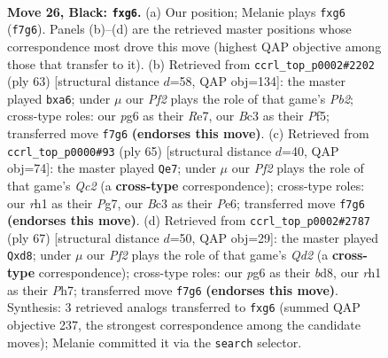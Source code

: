 \documentclass[11pt]{article}
\begin{document}
\clearpage

\begin{figure}[p]\centering
\begin{subfigure}{0.46\textwidth}\centering
\resizebox{\linewidth}{!}{%
\newchessgame
\chessboard[
  setfen={r5k1/p4p2/4p1P1/pq1p4/2rP1QP1/2b5/2P5/3K2RR b - - 0 26},
  showmover=false,
  pgfstyle=straightmove, color=movearrow, markmove={f7-g6}
]}
\caption{}
\end{subfigure}\hfill
\begin{subfigure}{0.46\textwidth}\centering
\resizebox{\linewidth}{!}{%
\newchessgame
\chessboard[
  setfen={2q3k1/1p2rp2/P3P1pp/2r2p2/R1P5/7P/6PK/R1Q5 b - - 0 32},
  showmover=false,
  pgfstyle=straightmove, color=movearrow, markmove={b7-a6}
]}
\caption{}
\end{subfigure}
\\[4pt]
\begin{subfigure}{0.46\textwidth}\centering
\resizebox{\linewidth}{!}{%
\newchessgame
\chessboard[
  setfen={5r1k/2q3p1/1r2p2p/1P1pp3/4P2P/8/4QPP1/1RR3K1 b - - 1 33},
  showmover=false,
  pgfstyle=straightmove, color=movearrow, markmove={c7-e7}
]}
\caption{}
\end{subfigure}\hfill
\begin{subfigure}{0.46\textwidth}\centering
\resizebox{\linewidth}{!}{%
\newchessgame
\chessboard[
  setfen={3B3k/3q1rpp/p2b4/1p6/2p2PP1/P3Q3/7P/R4R1K b - - 0 34},
  showmover=false,
  pgfstyle=straightmove, color=movearrow, markmove={d7-d8}
]}
\caption{}
\end{subfigure}
\caption{\textbf{Move 26, Black: \texttt{fxg6}.} (a) Our position; Melanie plays \texttt{fxg6} (\texttt{f7g6}). Panels (b)--(d) are the retrieved master positions whose correspondence most drove this move (highest QAP objective among those that transfer to it). (b) Retrieved from \texttt{ccrl\_top\_p0002\#2202} (ply 63) [structural distance $d$=58, QAP obj=134]: the master played \texttt{bxa6}; under $\mu$ our \emph{Pf2} plays the role of that game's \emph{Pb2}; cross-type roles: our \emph{p}g6 as their \emph{R}e7, our \emph{B}c3 as their \emph{P}f5; transferred move \texttt{f7g6} \textbf{(endorses this move)}. (c) Retrieved from \texttt{ccrl\_top\_p0000\#93} (ply 65) [structural distance $d$=40, QAP obj=74]: the master played \texttt{Qe7}; under $\mu$ our \emph{Pf2} plays the role of that game's \emph{Qc2} (a \textbf{cross-type} correspondence); cross-type roles: our \emph{r}h1 as their \emph{P}g7, our \emph{B}c3 as their \emph{P}e6; transferred move \texttt{f7g6} \textbf{(endorses this move)}. (d) Retrieved from \texttt{ccrl\_top\_p0002\#2787} (ply 67) [structural distance $d$=50, QAP obj=29]: the master played \texttt{Qxd8}; under $\mu$ our \emph{Pf2} plays the role of that game's \emph{Qd2} (a \textbf{cross-type} correspondence); cross-type roles: our \emph{p}g6 as their \emph{b}d8, our \emph{r}h1 as their \emph{P}h7; transferred move \texttt{f7g6} \textbf{(endorses this move)}. Synthesis: 3 retrieved analogs transferred to \texttt{fxg6} (summed QAP objective 237, the strongest correspondence among the candidate moves); Melanie committed it via the \texttt{search} selector.}
\label{fig:thought-m51}
\end{figure}
\end{document}
